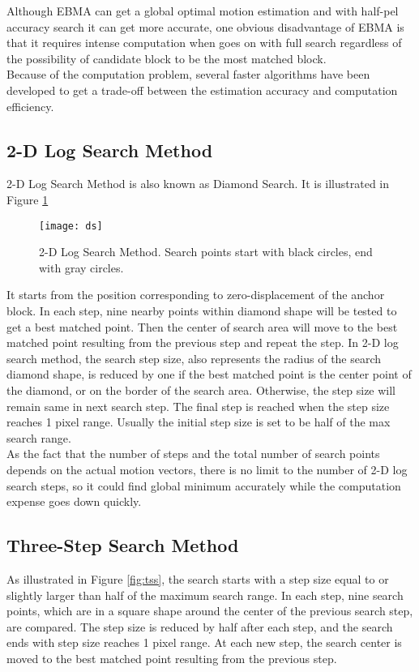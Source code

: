 \documentclass[a4paper, twocolumn]{article}
\begin{document}
	\noindent
	Although EBMA can get a global optimal motion estimation and with half-pel accuracy search it can get more accurate, one obvious disadvantage of EBMA is that it requires intense computation when goes on with full search regardless of the possibility of candidate block to be the most matched block. \\
	Because of the computation problem, several faster algorithms have been developed to get a trade-off between the estimation accuracy and computation efficiency.
	
	\subsection{2-D Log Search Method}
	2-D Log Search Method is also known as Diamond Search. It is illustrated in Figure \ref{fig:ds}
	
	\begin{figure}[h]
	\centering
	\texttt{[image: ds]}
	\caption{2-D Log Search Method. Search points start with black circles, end with gray circles.}
	\label{fig:ds}
	\end{figure}

	\noindent
	It starts from the position corresponding to zero-displacement of the anchor block. In each step, nine nearby points within diamond shape will be tested to get a best matched point. Then the center of search area will move to the best matched point resulting from the previous step and repeat the step. In 2-D log search method, the search step size, also represents the radius of the search diamond shape, is reduced by one if the best matched point is the center point of the diamond, or on the border of the search area. Otherwise, the step size will remain same in next search step.
	The final step is reached when the step size reaches 1 pixel range. Usually the initial step size is set to be half of the max search range. \\
	As the fact that the number of steps and the total number of search points depends on the actual motion vectors, there is no limit to the number of 2-D log search steps, so it could find global minimum accurately while the computation expense goes down quickly.
	
	\subsection{Three-Step Search Method}
	As illustrated in Figure \ref{fig:tss}, the search starts with a step size equal to or slightly larger than half of the maximum search range. In each step, nine search points, which are in a square shape around the center of the previous search step, are compared. The step size is reduced by half after each step, and the search ends with step size reaches 1 pixel range. At each new step, the search center is moved to the best matched point resulting from the previous step.
	
\end{document}
